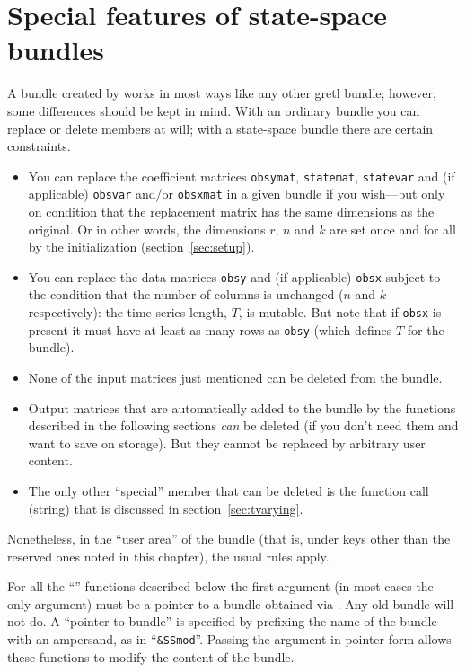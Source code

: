 \section{Special features of state-space bundles}
\label{sec:ss-special}

A bundle created by  works in most ways like any other
gretl bundle; however, some differences should be kept in mind.  With
an ordinary bundle you can replace or delete members at will; with a
state-space bundle there are certain constraints.

\begin{itemize}
\item You can replace the coefficient matrices \texttt{obsymat},
  \texttt{statemat}, \texttt{statevar} and (if applicable)
  \texttt{obsvar} and/or \texttt{obsxmat} in a given bundle if you
  wish---but only on condition that the replacement matrix has the
  same dimensions as the original. Or in other words, the dimensions
  $r$, $n$ and $k$ are set once and for all by the initialization
  (section~\ref{sec:setup}).
\item You can replace the data matrices \texttt{obsy} and (if
  applicable) \texttt{obsx} subject to the condition that the number
  of columns is unchanged ($n$ and $k$ respectively): the time-series
  length, $T$, is mutable. But note that if \texttt{obsx} is present
  it must have at least as many rows as \texttt{obsy} (which defines
  $T$ for the bundle).
\item None of the input matrices just mentioned can be deleted from
  the bundle.
\item Output matrices that are automatically added to the bundle by
  the functions described in the following sections \textit{can} be
  deleted (if you don't need them and want to save on storage). But
  they cannot be replaced by arbitrary user content.
\item The only other ``special'' member that can be deleted is the
  function call (string) that is discussed in
  section~\ref{sec:tvarying}.
\end{itemize}

Nonetheless, in the ``user area'' of the bundle (that is, under keys
other than the reserved ones noted in this chapter), the usual rules
apply.

For all the ``'' functions described below the first argument
(in most cases the only argument) must be a pointer to a bundle
obtained via . Any old bundle will not do. A ``pointer to
bundle'' is specified by prefixing the name of the bundle with an
ampersand, as in ``\verb|&SSmod|''. Passing the argument in pointer
form allows these functions to modify the content of the bundle.

